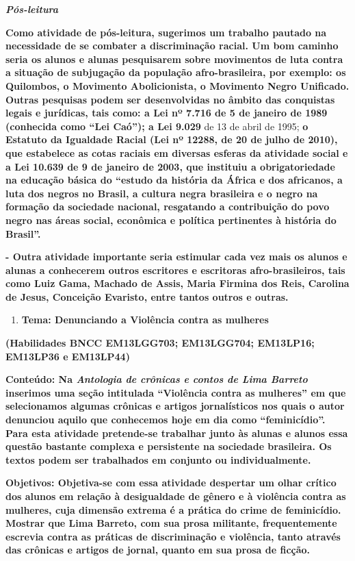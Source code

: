 \emph{\textbf{Pós-leitura}}

\textbf{Como atividade de pós-leitura, sugerimos um trabalho pautado na
necessidade de se combater a discriminação racial. Um bom caminho seria
os alunos e alunas pesquisarem sobre movimentos de luta contra a
situação de subjugação da população afro-brasileira, por exemplo: os
Quilombos, o Movimento Abolicionista, o Movimento Negro Unificado.
Outras pesquisas podem ser desenvolvidas no âmbito das conquistas legais
e jurídicas, tais como: a Lei nº 7.716 de 5 de janeiro de 1989
(conhecida como ``Lei Caó''); a Lei 9.029} de 13 de abril de 1995;
\textbf{o Estatuto da Igualdade Racial (Lei nº 12288, de 20 de julho de
2010), que estabelece as cotas raciais em diversas esferas da atividade
social e a Lei 10.639 de 9 de janeiro de 2003, que instituiu a
obrigatoriedade na educação básica do ``estudo da história da África e
dos africanos, a luta dos negros no Brasil, a cultura negra brasileira e
o negro na formação da sociedade nacional, resgatando a contribuição do
povo negro nas áreas social, econômica e política pertinentes à história
do Brasil''.}

\textbf{- Outra atividade importante seria estimular cada vez mais os
alunos e alunas a conhecerem outros escritores e escritoras
afro-brasileiros, tais como Luiz Gama, Machado de Assis, Maria Firmina
dos Reis, Carolina de Jesus, Conceição Evaristo, entre tantos outros e
outras. }

\begin{enumerate}
\def\labelenumi{\arabic{enumi})}
\setcounter{enumi}{1}
\item
  \textbf{Tema: Denunciando a Violência contra as mulheres}
\end{enumerate}

\textbf{(Habilidades BNCC EM13LGG703; EM13LGG704; EM13LP16; EM13LP36 e
EM13LP44)}

\textbf{Conteúdo: Na \emph{Antologia de crônicas e contos de Lima
Barreto} inserimos uma seção intitulada ``Violência contra as mulheres''
em que selecionamos algumas crônicas e artigos jornalísticos nos quais o
autor denunciou aquilo que conhecemos hoje em dia como ``feminicídio''.
Para esta atividade pretende-se trabalhar junto às alunas e alunos essa
questão bastante complexa e persistente na sociedade brasileira. Os
textos podem ser trabalhados em conjunto ou individualmente. }

\textbf{Objetivos: Objetiva-se com essa atividade despertar um olhar
crítico dos alunos em relação à desigualdade de gênero e à violência
contra as mulheres, cuja dimensão extrema é a prática do crime de
feminicídio. Mostrar que Lima Barreto, com sua prosa militante,
frequentemente escrevia contra as práticas de discriminação e violência,
tanto através das crônicas e artigos de jornal, quanto em sua prosa de
ficção. }

